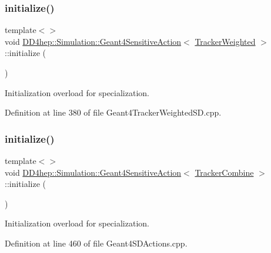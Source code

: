 \subsubsection{\texorpdfstring{initialize()}{initialize()}\hspace{0.1cm}{\footnotesize\ttfamily [1/3]}}
{\footnotesize\ttfamily template$<$$>$ \\
void \hyperlink{class_d_d4hep_1_1_simulation_1_1_geant4_sensitive_action}{D\+D4hep\+::\+Simulation\+::\+Geant4\+Sensitive\+Action}$<$ \hyperlink{struct_d_d4hep_1_1_simulation_1_1_tracker_weighted}{Tracker\+Weighted} $>$\+::initialize (\begin{DoxyParamCaption}{ }\end{DoxyParamCaption})}



Initialization overload for specialization. 



Definition at line 380 of file Geant4\+Tracker\+Weighted\+S\+D.\+cpp.

\hypertarget{class_d_d4hep_1_1_simulation_1_1_geant4_sensitive_action_af2f8b12bf21623f0ab2c0f409e3921fd}{}\label{class_d_d4hep_1_1_simulation_1_1_geant4_sensitive_action_af2f8b12bf21623f0ab2c0f409e3921fd} 
\subsubsection{\texorpdfstring{initialize()}{initialize()}\hspace{0.1cm}{\footnotesize\ttfamily [2/3]}}
{\footnotesize\ttfamily template$<$$>$ \\
void \hyperlink{class_d_d4hep_1_1_simulation_1_1_geant4_sensitive_action}{D\+D4hep\+::\+Simulation\+::\+Geant4\+Sensitive\+Action}$<$ \hyperlink{struct_d_d4hep_1_1_simulation_1_1_tracker_combine}{Tracker\+Combine} $>$\+::initialize (\begin{DoxyParamCaption}{ }\end{DoxyParamCaption})}



Initialization overload for specialization. 



Definition at line 460 of file Geant4\+S\+D\+Actions.\+cpp.

